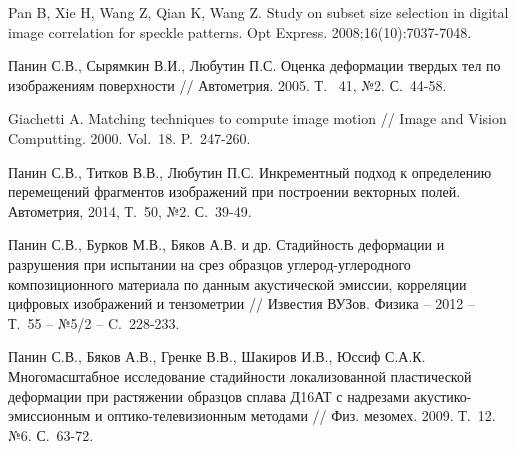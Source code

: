 \documentclass[a4paper]{jctart10}
\begin{document}
\begin{thebibliography}{99}
		  {\sc Pan B, Xie H, Wang Z, Qian K, Wang Z.} Study on subset size selection in digital image correlation for speckle patterns. Opt Express. 2008;16(10):7037-7048.
		
		  {\sc Панин С.В., Сырямкин В.И., Любутин П.С.} Оценка деформации твердых тел по изображениям поверхности // Автометрия. 2005. Т. ~41, №2. С.~44-58.
		
		  {\sc Giachetti A.} Matching techniques to compute image motion // Image and Vision Computting. 2000. Vol.~18. P.~247-260.
		
		  {\sc Панин С.В., Титков В.В., Любутин П.С.} Инкрементный подход к определению перемещений фрагментов изображений при построении векторных полей. Автометрия, 2014, Т.~50, №2. С.~39-49.
				
		  {\sc Панин С.В., Бурков М.В., Бяков А.В. и др.} Стадийность деформации и разрушения при испытании на срез образцов углерод-углеродного композиционного материала по данным акустической эмиссии, корреляции цифровых изображений и тензометрии // Известия ВУЗов. Физика – 2012 – Т.~55 – №5/2 – C.~228-233.
		
		  {\sc Панин С.В., Бяков А.В., Гренке В.В., Шакиров И.В., Юссиф С.А.К.} Многомасштабное исследование стадийности локализованной пластической деформации при растяжении образцов сплава Д16АТ с надрезами акустико-эмиссионным и оптико-телевизионным методами // Физ. мезомех. 2009. Т.~12. №6. С.~63-72.

		
\end{thebibliography}


\end{document}
